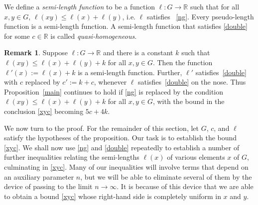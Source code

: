 \documentclass[11pt,a4paper,reqno]{amsart}
\numberwithin{equation}{section}
\theoremstyle{plain}
\theoremstyle{definition}
\newtheorem{remark}[equation]{Remark}
\newcommand\R{\mathbb{R}}
\newcommand\normsymb{\ell}  %
\newcommand\norm[1]{\ell({#1})}   %
\begin{document}
{ We define a \emph{semi-length function} to be a function
$\normsymb: G \to \R$ such that for all $x, y\in G$, $\norm{xy} \leq
\norm{x} + \norm{y}$, i.e.  $\normsymb$ satisfies ~\eqref{ng}. Every
pseudo-length function is a semi-length function. A semi-length function
that satisfies \eqref{double} for some $c\in\R$ is called
\emph{quasi-homogeneous}.

\begin{remark}\label{quasilength}
Suppose $\normsymb: G \to \R$ and there is a constant $k$ such that
$\norm{xy} \leq \norm{x} + \norm{y} + k$ for all $x, y\in G$. Then the
function $\normsymb'(x) := \norm{x} + k$ is a semi-length {
function}. Further,
$\normsymb'$ satisfies~\eqref{double} with $c$ replaced by $c' := k+c$,
{ whenever $\normsymb$ satisfies~\eqref{double} on the nose.}
Thus Proposition~\ref{main} continues to hold if \eqref{ng} is replaced
by the condition $\norm{xy} \leq \norm{x} + \norm{y} + k$ for all $x,
y\in G$, with the bound in the conclusion \eqref{xyc} becoming $5c + 4k$.
\end{remark}
}

We now turn to the proof. For the remainder of this section, let $G$,
{ $c$}, and $\normsymb$ satisfy the hypotheses of the
proposition.  Our task is to establish the bound \eqref{xyc}.  We shall
now use \eqref{ng} and \eqref{double} repeatedly to establish a number of
further inequalities relating the { semi-}lengths $\norm{x}$ of various
elements $x$ of $G$, culminating in \eqref{xyc}.
Many of our inequalities will involve terms that depend on an auxiliary
parameter $n$, but we will be able to eliminate several of them by the
device of passing to the limit $n \to \infty$.  It is because of this
device that we are able to obtain a bound \eqref{xyc} whose right-hand
side is completely uniform in $x$ and $y$.
\end{document}
